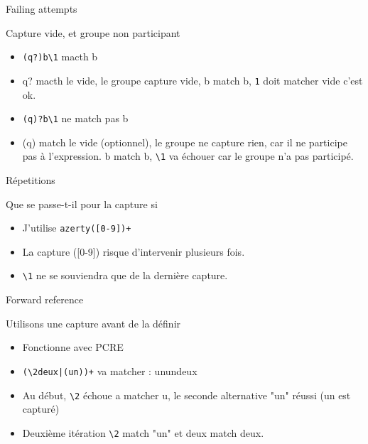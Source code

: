 \def\ftitle{Failing attempts}
\begin{frame}[containsverbatim]{\ftitle}
\def\blocktitle{Capture vide, et groupe non participant}
\begin{block}{\blocktitle}
\begin{itemize}
\item \verb!(q?)b\1! macth b 
\item q? macth le vide, le groupe capture vide, b match b, \verb!1! doit matcher vide c'est ok.
\item \verb!(q)?b\1! ne match pas b
\item (q) match le vide (optionnel), le groupe ne capture rien, car il ne participe pas à l'expression. b match b, \verb!\1! va échouer car le groupe n'a pas participé.
\end{itemize}
\end{block}
\end{frame}


\def\ftitle{Répetitions}
\begin{frame}[containsverbatim]{\ftitle}
\def\blocktitle{Que se passe-t-il pour la capture si}
\begin{block}{\blocktitle}
\begin{itemize}
\item J'utilise \verb!azerty([0-9])+!
\item La capture ([0-9]) risque d'intervenir plusieurs fois.
\item \verb!\1! ne se souviendra que de la dernière capture.
\end{itemize}
\end{block}
\end{frame}


\def\ftitle{Forward reference}
\begin{frame}[containsverbatim]{\ftitle}
\def\blocktitle{Utilisons une capture avant de la définir}
\begin{block}{\blocktitle}
\begin{itemize}
\item Fonctionne avec PCRE
\item \verb!(\2deux|(un))+! va matcher : unundeux
\item Au début, \verb!\2! échoue a matcher u, le seconde alternative "un" réussi (un est capturé)
\item Deuxième itération \verb!\2! match "un" et deux match deux.
\end{itemize}
\end{block}
\end{frame}


